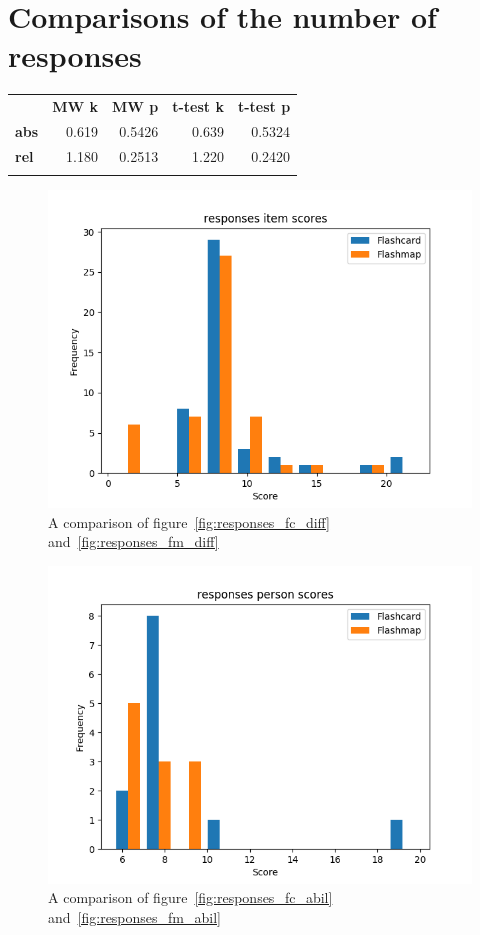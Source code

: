 \FloatBarrier
\section{Comparisons of the number of responses}

\begin{longtable}[c]{@{}lrrrr@{}}
\toprule\addlinespace
& \textbf{MW k} & \textbf{MW p} &
\textbf{t-test k} & \textbf{t-test p}
\\\addlinespace
\midrule
\textbf{abs} & 0.619 & 0.5426 & 0.639 & 0.5324
\\\addlinespace
\textbf{rel} & 1.180 & 0.2513 & 1.220 & 0.2420
\\\addlinespace
\bottomrule
    \label{tab:responses_comp}
\end{longtable}

\begin{figure}
    \centering
    \includegraphics[width=.7\textwidth]{img/responses_diff.png}
    \caption{A comparison of figure~\protect\ref{fig:responses_fc_diff} and~\protect\ref{fig:responses_fm_diff}}
    \label{fig:responses_diff}
\end{figure}
\begin{figure}
    \centering
    \includegraphics[width=.7\textwidth]{img/responses_abil.png}
    \caption{A comparison of figure~\protect\ref{fig:responses_fc_abil} and~\protect\ref{fig:responses_fm_abil}}
    \label{fig:responses_abil}
\end{figure}

